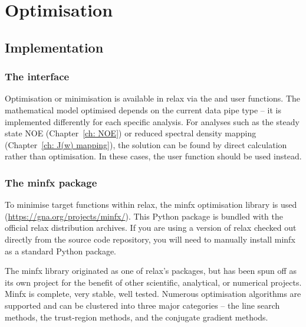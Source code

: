 
\chapter{Optimisation}
\label{ch: optimisation}




\section{Implementation}




\subsection{The interface}

Optimisation or minimisation is available in relax via the  and  user functions.
The mathematical model optimised depends on the current data pipe type -- it is implemented differently for each specific analysis.
For analyses such as the steady state NOE (Chapter~\ref{ch: NOE}) or reduced spectral density mapping (Chapter~\ref{ch: J(w) mapping}), the solution can be found by direct calculation rather than optimisation.
In these cases, the  user function should be used instead.




\subsection{The minfx package}

To minimise target functions within relax, the minfx optimisation library is used (\href{https://gna.org/projects/minfx/}{https://gna.org/projects/minfx/}).
This Python package is bundled with the official relax distribution archives.
If you are using a version of relax checked out directly from the source code repository, you will need to manually install minfx as a standard Python package.

The minfx library originated as one of relax's packages, but has been spun off as its own project for the benefit of other scientific, analytical, or numerical projects.
Minfx is complete, very stable, well tested.
Numerous optimisation algorithms are supported and can be clustered into three major categories -- the line search methods, the trust-region methods, and the conjugate gradient methods.


